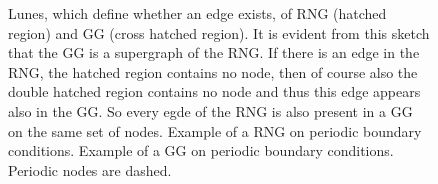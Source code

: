 \documentclass[pre,twocolumn,groupedaddress,showpacs,showkeys,amsmath,amssymb,floatfix]{revtex4-1}
\begin{document}
            \begin{figure}[htbp]
                \centering
                \caption[Gabriel and Relative Neighborhood Graph]
                {
                     Lunes, which define whether an edge
                        exists, of RNG (hatched region) and GG (cross hatched region).
                        It is evident from this sketch that the GG is a supergraph
                        of the RNG. If there is an edge in the RNG, the hatched
                        region contains no node, then of course also the double
                        hatched region contains no node and thus this edge appears
                        also in the GG. So every egde of the RNG is also present
                        in a GG on the same set of nodes.
                     Example of a RNG on periodic
                        boundary conditions.
                     Example of a GG on
                        periodic boundary conditions. Periodic nodes are dashed.
                }
                \label{fig:lunes}
            \end{figure}
\end{document}
